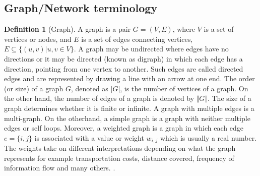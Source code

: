 \documentclass[10pt,a4paper]{article}
\theoremstyle{plain}
\theoremstyle{definition}
\newtheorem{defn}[subsection]{Definition}
\begin{document}
\subsection{Graph/Network terminology}
\begin{defn}[Graph]
	A graph is a pair $G = (V,E)$, where $V$ is a set of vertices or nodes, and $E$ is a set of edges connecting vertices, $E \subseteq \{(u, v )|u, v \in V \}$. A graph may be undirected where edges have no directions or it may be directed (known as digraph) in which each edge has a direction, pointing from one vertex to another. Such edges are called directed edges and are represented by drawing a line with an arrow at one end. The order (or size) of a graph $G$, denoted as $|G|$, is the number of vertices of a graph. On the other hand, the number of edges of a graph is denoted by $\Vert G \Vert$. The size of a graph determines whether it is finite or infinite. A graph with multiple edges is a multi-graph. On the otherhand, a simple graph is a graph with neither multiple edges or self loops. Moreover, a weighted graph is a graph in which each edge $e=\{i,j\}$ is associated with a value or weight $w_{i,j}$ which is usually a real number. The weights take on different interpretations depending on what the graph represents for example transportation costs, distance covered, frequency of information flow and many others. \citep{newman2010networks}.\\	
\end{defn}
\end{document}

